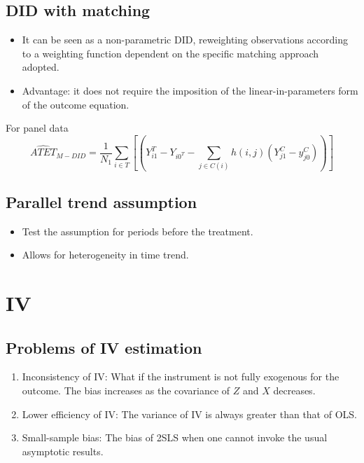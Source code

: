 \documentclass[
]{ctexart}
\providecommand{\tightlist}{%
  \setlength{\itemsep}{0pt}\setlength{\parskip}{0pt}}
\newcommand{\0}{\textbf 0}
\newcommand{\1}{\textbf 1}
\def\br#1{\left[#1\right]}
\def\pr#1{\left(#1\right)}
\begin{document}
\hypertarget{did-with-matching}{%
\subsection{DID with matching}\label{did-with-matching}}

\begin{itemize}
\tightlist
\item
  It can be seen as a non-parametric DID, reweighting observations
  according to a weighting function dependent on the specific matching
  approach adopted.
\item
  Advantage: it does not require the imposition of the
  linear-in-parameters form of the outcome equation.
\end{itemize}

For panel data \[
\widehat{ATET}_{\mathit{M-DID}} = \frac1{N_1}\sum_{i\in T}\br{\pr{Y_{i1}^T-Y_{i0^T}-\sum_{j\in C\pr i}h\pr{i,j}\pr{Y_{j1}^C-y_{j0}^C}}}
\]

\hypertarget{parallel-trend-assumption}{%
\subsection{Parallel trend assumption}\label{parallel-trend-assumption}}

\begin{itemize}
\tightlist
\item
  Test the assumption for periods before the treatment.
\item
  Allows for heterogeneity in time trend.
\end{itemize}

\hypertarget{iv}{%
\section{IV}\label{iv}}

\hypertarget{problems-of-iv-estimation}{%
\subsection{Problems of IV estimation}\label{problems-of-iv-estimation}}

\begin{enumerate}
\def\labelenumi{\arabic{enumi}.}
\tightlist
\item
  Inconsistency of IV: What if the instrument is not fully exogenous for
  the outcome. The bias increases as the covariance of \(Z\) and \(X\)
  decreases.
\item
  Lower efficiency of IV: The variance of IV is always greater than that
  of OLS.
\item
  Small-sample bias: The bias of 2SLS when one cannot invoke the usual
  asymptotic results.
\end{enumerate}
\end{document}

